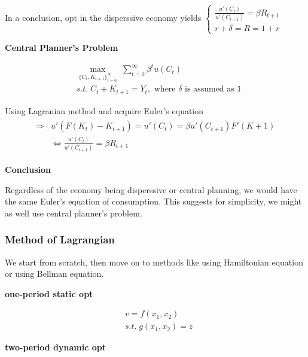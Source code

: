 \documentclass{article}
\begin{document}
In a conclusion, opt in the disperssive economy yields
$\begin{cases}
  \frac{u'(C_{t})}{u'(C_{t+1})}=\beta R_{t+1}\\
  r+\delta=R=1+r
\end{cases}$


\textbf{Central Planner's Problem} 

\begin{equation}
\begin{split}
&\mathop{max}_{\{C_{t},K_{t+1}\}_{t=0}^{\infty}} \; \sum\limits_{t=0}^{\infty} \beta^{t}u(C_{t})
\\& s.t. \; C_{t}+K_{t+1}=Y_{t}, \text{ where } \delta \text{ is assumed as 1}
\end{split}
\end{equation}

Using Lagranian method and acquire Euler's equation
\begin{align}
\begin{split}
\Rightarrow & u'(F(K_{t})-K_{t+1})=u'(C_{t})=\beta u'(C_{t+1})F'(K+1)
\\&\iff \frac{u'(C_{t})}{u'(C_{t+1})}=\beta R_{t+1}
\end{split}
\end{align} 

\textbf{Conclusion}

Regardless of the economy being disperssive or central planning, we would have the same Euler's equation of consumption. This suggests for simplicity, we might as well use central planner's problem.






\subsubsection{Method of Lagrangian}\label{method-of-lagrangian}

We start from scratch, then move on to methods like using Hamiltonian equation or using Bellman equation.

\textbf{one-period static opt} 

\begin{equation}
\begin{split}
&v=f(x_{1},x_{2})
\\&s.t. \; g(x_{1},x_{2})=z
\end{split}
\end{equation}



\textbf{two-period dynamic opt} 
\end{document}
